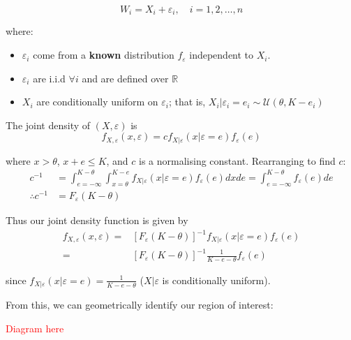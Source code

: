 \[
W_i = X_i + \varepsilon_i, \quad i = 1, 2, \dots, n
\]

where:
\begin{itemize}
    \item $\varepsilon_i$ come from a \textbf{known} distribution $f_{\varepsilon}$ independent to $X_i$.
    \item $\varepsilon_i$ are i.i.d $\forall i$ and are defined over $\mathbb{R}$
    \item $X_i$ are conditionally uniform on $\varepsilon_i$; that is, $X_i | \varepsilon_i = e_i \sim \mathcal{U}(\theta, K - e_i) $
\end{itemize}

The joint density of $(X, \varepsilon)$ is \[ f_{X, \varepsilon} ( x , \varepsilon) = c f_{X | \varepsilon} ( x | \varepsilon=e) f_\varepsilon(e) \]

where $x > \theta$, $x+e \leq K$, and $c$ is a normalising constant. Rearranging to find $c$:
\begin{align*}
    c^{-1}
        &= \int_{e=-\infty}^{K-\theta} \int_{x=\theta}^{K-e} f_{X | \varepsilon} ( x | \varepsilon=e) f_\varepsilon(e) dx de = \int_{e=-\infty}^{K-\theta} f_\varepsilon(e) de \\
    \therefore c^{-1} &= F_\varepsilon(K - \theta)
\end{align*}

Thus our joint density function is given by \begin{align*}
    f_{X, \varepsilon} ( x , \varepsilon)
        =& [F_\varepsilon(K - \theta)]^{-1} f_{X | \varepsilon} ( x | \varepsilon=e) f_\varepsilon(e) \\
        =& [F_\varepsilon(K - \theta)]^{-1} \frac{1}{K - e - \theta} f_\varepsilon(e)
\end{align*}

since $f_{X | \varepsilon} ( x | \varepsilon=e) = \frac{1}{K - e - \theta}$ ($X|\varepsilon$ is conditionally uniform). 

From this, we can geometrically identify our region of interest:

\textcolor{red}{Diagram here} %

